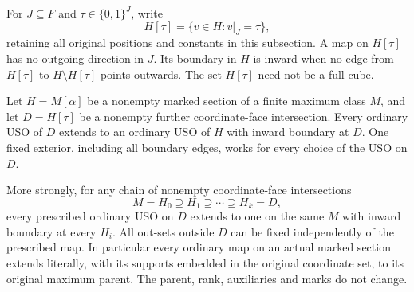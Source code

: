 For $J\subseteq F$ and $\tau\in\{0,1\}^J$, write
\[
 H[\tau]=\{v\in H:v|_J=\tau\},
\]
retaining all original positions and constants in this subsection.
A map on $H[\tau]$ has no outgoing direction in $J$. Its boundary in
$H$ is inward when no edge from $H[\tau]$ to $H\setminus H[\tau]$
points outwards. The set $H[\tau]$ need not be a full cube.

\begin{theorem}
\label{thm:maxmin-coordinate-face-inward}
Let $H=M[\alpha]$ be a nonempty marked section of a finite maximum
class $M$, and let $D=H[\tau]$ be a nonempty further coordinate-face
intersection. Every ordinary USO of $D$ extends to an ordinary USO
of $H$ with inward boundary at $D$. One fixed exterior, including
all boundary edges, works for every choice of the USO on $D$.

More strongly, for any chain of nonempty coordinate-face intersections
\[
 M=H_0\supseteq H_1\supseteq\cdots\supseteq H_k=D,
\]
every prescribed ordinary USO on $D$ extends to one on the same $M$
with inward boundary at every $H_i$. All out-sets outside $D$ can be
fixed independently of the prescribed map. In particular every
ordinary map on an actual marked section extends literally, with its
supports embedded in the original coordinate set, to its original
maximum parent. The parent, rank, auxiliaries and marks do not change.
\end{theorem}

